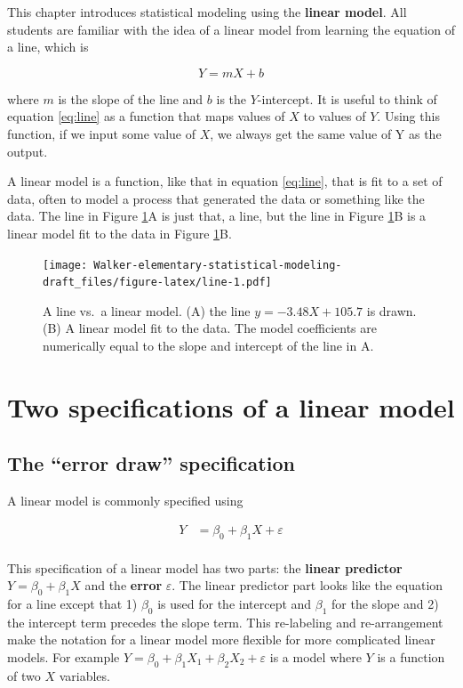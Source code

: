 \documentclass[]{book}
\begin{document}
This chapter introduces statistical modeling using the \textbf{linear
model}. All students are familiar with the idea of a linear model from
learning the equation of a line, which is

\begin{equation}
Y = mX + b
\label{eq:line}
\end{equation}

where \(m\) is the slope of the line and \(b\) is the \(Y\)-intercept.
It is useful to think of equation \eqref{eq:line} as a function that maps
values of \(X\) to values of \(Y\). Using this function, if we input
some value of \(X\), we always get the same value of Y as the output.

A linear model is a function, like that in equation \eqref{eq:line}, that
is fit to a set of data, often to model a process that generated the
data or something like the data. The line in Figure \ref{fig:line}A is
just that, a line, but the line in Figure \ref{fig:line}B is a linear
model fit to the data in Figure \ref{fig:line}B.

\begin{figure}
\centering
\texttt{[image: Walker-elementary-statistical-modeling-draft\_files/figure-latex/line-1.pdf]}
\caption{\label{fig:line}A line vs.~a linear model. (A) the line
\(y=-3.48X + 105.7\) is drawn. (B) A linear model fit to the data. The
model coefficients are numerically equal to the slope and intercept of
the line in A.}
\end{figure}

\section{Two specifications of a linear
model}\label{two-specifications-of-a-linear-model}

\subsection{\texorpdfstring{The ``error draw''
specification}{The error draw specification}}\label{the-error-draw-specification}

A linear model is commonly specified using

\begin{align}
Y &= \beta_0 + \beta_1 X + \varepsilon\\
\label{eq:lm}
\end{align}

This specification of a linear model has two parts: the \textbf{linear
predictor} \(Y = \beta_0 + \beta_1 X\) and the \textbf{error}
\(\varepsilon\). The linear predictor part looks like the equation for a
line except that 1) \(\beta_0\) is used for the intercept and
\(\beta_1\) for the slope and 2) the intercept term precedes the slope
term. This re-labeling and re-arrangement make the notation for a linear
model more flexible for more complicated linear models. For example
\(Y = \beta_0 + \beta_1 X_1 + \beta_2 X_2 + \varepsilon\) is a model
where \(Y\) is a function of two \(X\) variables.
\end{document}
